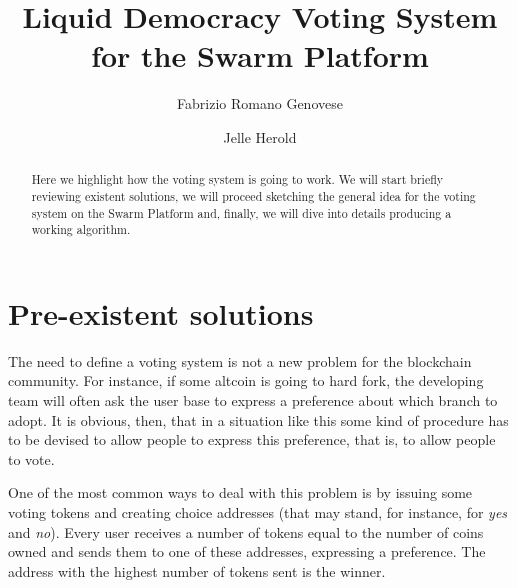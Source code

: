 \documentclass[submission, copyright,creativecommons,sharealike,noncommercial]{eptcs}
\title{Liquid Democracy Voting System for the Swarm Platform}
\author{Fabrizio Romano Genovese
	\institute{Swarm Team}
	\institute{Quantum Group \\ University of Oxford}
	\email{fabrizio@swarm.fund}
\and
Jelle Herold
	\institute{Swarm Team}
	\email{jelle@swarm.fund}
}
\begin{document}
%	
	
	\maketitle

	\begin{abstract}
		Here we highlight how the voting system is going to work. We will start briefly reviewing existent solutions, we will proceed sketching the general idea for the voting system on the Swarm Platform and, finally, we will dive into details producing a working algorithm.
	\end{abstract}

\section{Pre-existent solutions}\label{sec:Pre-existent solutions}
	The need to define a voting system is not a new problem for the blockchain community. For instance, if some altcoin is going to hard fork, the developing team will often ask the user base to express a preference about which branch to adopt. It is obvious, then, that in a situation like this some kind of procedure has to be devised to allow people to express this preference, that is, to allow people to vote.
	
	One of the most common ways to deal with this problem is by issuing some voting tokens and creating choice addresses (that may stand, for instance, for \emph{yes} and \emph{no}). Every user receives a number of tokens equal to the number of coins owned and sends them to one of these addresses, expressing a preference. The address with the highest number of tokens sent is the winner.
	
\end{document}
